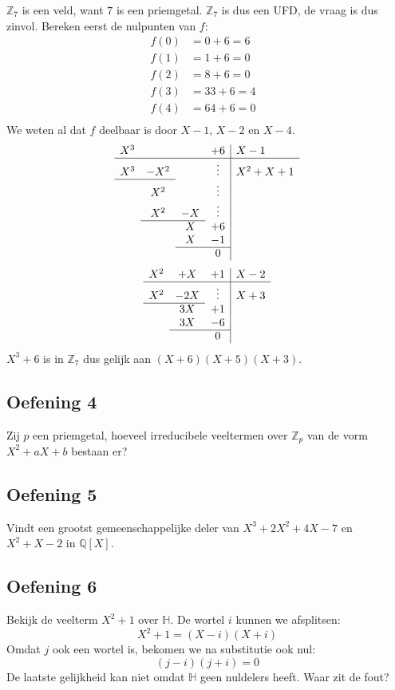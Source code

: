 \documentclass[main.tex]{subfiles}
\begin{document}
$\mathbb{Z}_{7}$ is een veld, want $7$ is een priemgetal.
$\mathbb{Z}_{7}$ is dus een UFD, de vraag is dus zinvol.
Bereken eerst de nulpunten van $f$:
\[
\begin{array}{rll}
  f(0) &= 0 + 6 = 6&\\
  f(1) &= 1 + 6 = 0&\\
  f(2) &= 8 + 6 = 0&\\
  f(3) &= 33 + 6 = 4&\\
  f(4) &= 64 + 6 = 0&\\
\end{array}
\]
We weten al dat $f$ deelbaar is door $X-1$, $X-2$ en $X-4$.
\[
\begin{array}{cccc|l}
  X^{3} & & & +6 & X-1\\\hline
  X^{3} & -X^{2} &  &\vdots & X^{2}+X+1\\\cline{1-2}
       & X^{2} & & \vdots & \\
       & X^{2} & -X & \vdots &\\\cline{2-3}
       &       & X & +6 &\\
       &       & X & -1 &\\\cline{3-4}
       &       &   & 0 
\end{array}
\]
\[
\begin{array}{ccc|l}
  X^{2} & +X & +1 & X-2\\\hline
  X^{2} & -2X & \vdots & X+3\\\cline{1-2} 
       & 3X & +1 & \\
       & 3X & -6 &\\\cline{2-3}
       &    & 0
\end{array}
\]
$X^{3}+6$ is in $\mathbb{Z}_{7}$ dus gelijk aan $(X+6)(X+5)(X+3)$.


\subsection*{Oefening 4}
Zij $p$ een priemgetal, hoeveel irreducibele veeltermen over $\mathbb{Z}_{p}$ van de vorm $X^{2}+aX+b$ bestaan er?

\subsection*{Oefening 5}
Vindt een grootst gemeenschappelijke deler van $X^{3}+2X^{2}+4X-7$ en $X^{2}+X-2$ in $\mathbb{Q}[X]$.

\subsection*{Oefening 6}
Bekijk de veelterm $X^{2}+1$ over $\mathbb{H}$.
De wortel $i$ kunnen we afsplitsen:
\[ X^{2}+1 = (X-i)(X+i) \]
Omdat $j$ ook een wortel is, bekomen we na substitutie ook nul:
\[ (j-i)(j+i) = 0 \]
De laatste gelijkheid kan niet omdat $\mathbb{H}$ geen nuldelers heeft.
Waar zit de fout?
\end{document}
